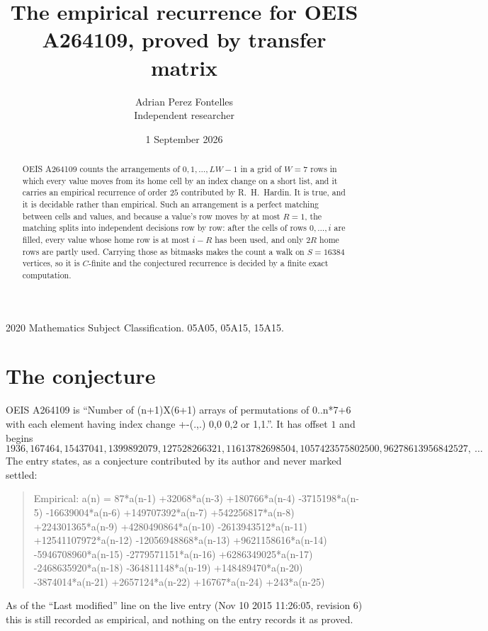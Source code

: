 \documentclass[11pt,a4paper]{article}
\title{The empirical recurrence for OEIS A264109, proved by transfer matrix}
\author{Adrian Perez Fontelles\\ \small Independent researcher}
\date{1 September 2026}
\theoremstyle{plain}
\theoremstyle{definition}
\begin{document}
\maketitle

\begin{abstract}
OEIS A264109 counts the arrangements of $0,1,\dots,LW-1$ in a grid of $W=7$ rows in which
every value moves from its home cell by an index change on a short list, and it carries an
empirical recurrence of order $25$ contributed by R.~H.~Hardin. It is true, and it is
decidable rather than empirical. Such an arrangement is a perfect matching between cells and
values, and because a value's row moves by at most $R=1$, the matching splits into
independent decisions row by row: after the cells of rows $0,\dots,i$ are filled,
every value whose home row is at most $i-R$ has been used, and only $2R$ home rows are
partly used. Carrying those as bitmasks makes the count a walk on $S=16384$ vertices, so it is
$C$-finite and the conjectured recurrence is decided by a finite exact computation.
\end{abstract}

\noindent\small 2020 Mathematics Subject Classification. 05A05, 05A15, 15A15.\normalsize

\section{The conjecture}

OEIS A264109 is ``Number of (n+1)X(6+1) arrays of permutations of 0..n*7+6 with each element having index change +-(.,.) 0,0 0,2 or 1,1.''. It has offset $1$ and begins
\[
1936, 167464, 15437041, 1399892079, 127528266321, 11613782698504, 1057423575802500, 96278613956842527,\ \dots
\]
The entry states, as a conjecture contributed by its author and never marked settled:
\begin{quote}
Empirical: a(n) = 87*a(n-1) +32068*a(n-3) +180766*a(n-4) -3715198*a(n-5) -16639004*a(n-6) +149707392*a(n-7) +542256817*a(n-8) +224301365*a(n-9) +4280490864*a(n-10) -2613943512*a(n-11) +12541107972*a(n-12) -12056948868*a(n-13) +9621158616*a(n-14) -5946708960*a(n-15) -2779571151*a(n-16) +6286349025*a(n-17) -2468635920*a(n-18) -364811148*a(n-19) +148489470*a(n-20) -3874014*a(n-21) +2657124*a(n-22) +16767*a(n-24) +243*a(n-25)
\end{quote}
As of the ``Last modified'' line on the live entry (Nov 10 2015 11:26:05, revision 6) this is still
recorded as empirical, and nothing on the entry records it as proved.
\end{document}
